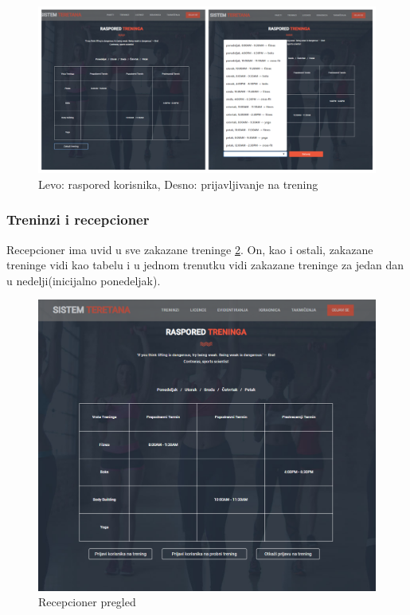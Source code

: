 \documentclass[../main.tex]{subfiles}
\begin{document}
\begin{figure}[!ht]
\begin{center}
\includegraphics[scale=0.35]{sections/korisnicki_interfejs/screenshots/korisnik_raspored.png}
\end{center}
\caption{ Levo: raspored korisnika, Desno: prijavljivanje na trening }
\label{fig:trener_toolbar}
\end{figure}

\subsubsection{Treninzi i recepcioner}
Recepcioner ima uvid u sve zakazane treninge \ref{fig:recepcioner_pregled}. On, kao i ostali, zakazane treninge vidi kao tabelu i u jednom trenutku vidi zakazane treninge za jedan dan u nedelji(inicijalno ponedeljak).

\begin{figure}[!ht]
\begin{center}
\includegraphics[scale=0.35]{sections/korisnicki_interfejs/screenshots/recepcioner_pregled_zakazanih_treninga.PNG}
\end{center}
\caption{Recepcioner pregled}
\label{fig:recepcioner_pregled}
\end{figure}
\end{document}
